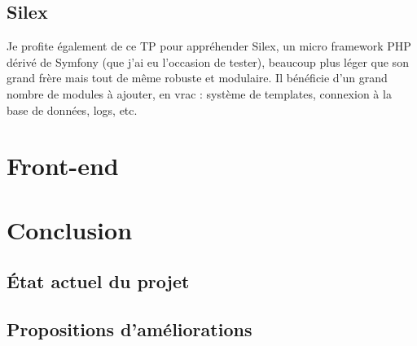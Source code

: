 \documentclass[a4paper, 11pt]{article}
\begin{document}
\subsection{Silex}
Je profite également de ce TP pour appréhender Silex, un micro framework PHP dérivé de Symfony (que j'ai eu l'occasion 
de tester), beaucoup plus léger que son grand frère mais tout de même robuste et modulaire. Il bénéficie d'un 
grand nombre de modules à ajouter, en vrac : système de templates, connexion à la base de données, logs, etc.





\section{Front-end}



\section{Conclusion}
\subsection{État actuel du projet}

\subsection{Propositions d'améliorations}
\end{document}
